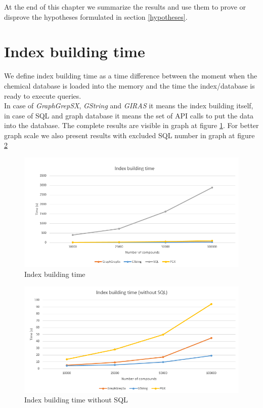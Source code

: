 At the end of this chapter we summarize the results and use them to prove or disprove the hypotheses formulated in section \ref{hypotheses}.

\section{Index building time}

We define index building time as a time difference between the moment when the chemical database is loaded into the memory and the time the index/database is ready to execute queries.\\

In case of \textit{GraphGrepSX}, \textit{GString} and \textit{GIRAS} it means the index building itself, in case of SQL and graph database it means the set of API calls to put the data into the database. The complete results are visible in graph at figure \ref{fig:indextime}. For better graph scale we also present results with excluded SQL number in graph at figure \ref{fig:indextimenosql}\\

\begin{figure}[h]
	\centering
	\includegraphics[width=1\textwidth]{../img/indexBuildingTime.png}
	\caption{Index building time}
	\label{fig:indextime}
\end{figure}

\begin{figure}[h]
	\centering
	\includegraphics[width=1\textwidth]{../img/indexBuildingTimeNoSQL.png}
	\caption{Index building time without SQL}
	\label{fig:indextimenosql}
\end{figure}

